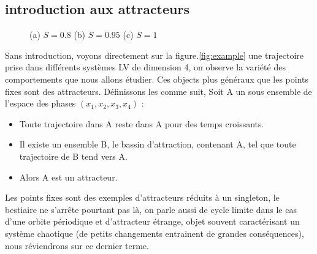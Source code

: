 \documentclass{wsdcr}
\begin{document}
\subsection{introduction aux attracteurs}
\begin{figure}
    \centering
    \caption{(a) $S=0.8$ (b) $S=0.95$ (c) $S=1$}
    \label{fig:exemple}
\end{figure}
Sans introduction, voyons directement sur la figure.\ref{fig:example} une trajectoire prise dans différents systèmes LV de dimension 4, on observe la variété des comportements que nous allons étudier. Ces objects plus généraux que les points fixes sont des attracteurs. Définissons les comme suit, Soit A un sous ensemble de l'espace des phases $(x_1,x_2,x_3,x_4)$ :
\begin{itemize}
	\item Toute trajectoire dans A reste dans A pour des temps croissants.
	\item Il existe un ensemble B, le bassin d'attraction, contenant A, tel que toute trajectoire de B tend vers A.
	\item Alors A est un attracteur.
\end{itemize}
Les points fixes sont des exemples d'attracteurs réduits à un singleton, le bestiaire ne s'arrête pourtant pas là, on parle aussi de cycle limite dans le cas d'une orbite périodique et d'attracteur étrange, objet souvent caractérisant un système chaotique (de petits changements entrainent de grandes conséquences), nous réviendrons sur ce dernier terme. \\
\end{document}
